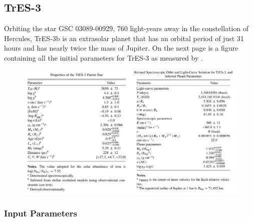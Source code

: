 \documentclass[11pt]{article}
\begin{document}
\hypertarget{tres-3}{%
\subsection{TrES-3}\label{tres-3}}

Orbiting the star GSC 03089-00929, 760 light-years away in the
constellation of Hercules, TrES-3b is an extrasolar planet that has an
orbital period of just 31 hours and has nearly twice the mass of
Jupiter. On the next page is a figure containing all the initial parameters for TrES-3 as measured by \cite{Sozzetti}.

\begin{figure}
	\centering
	\includegraphics[width=1\linewidth]{../images/TrES-3_combined.png}
	\label{Tab_2}
\end{figure}

\medskip

\subsubsection*{Input Parameters}
\end{document}
